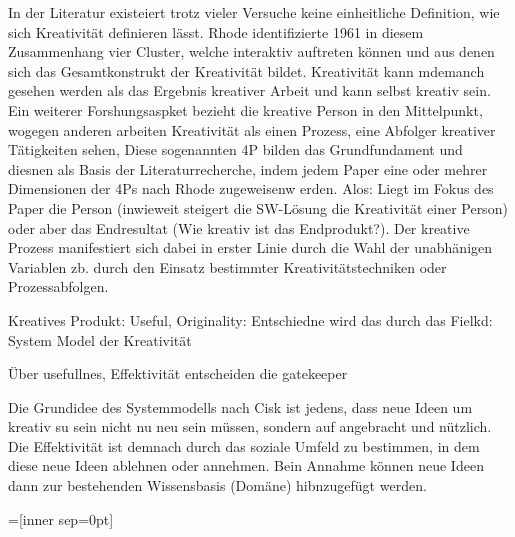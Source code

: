 In der Literatur existeiert trotz vieler Versuche keine einheitliche Definition, wie sich Kreativität definieren lässt. Rhode identifizierte 1961 in diesem Zusammenhang vier Cluster, welche interaktiv auftreten können und aus denen sich das Gesamtkonstrukt der Kreativität bildet. Kreativität kann mdemanch gesehen werden als das Ergebnis kreativer Arbeit und kann selbst kreativ sein. Ein weiterer Forshungsaspket bezieht die kreative Person in den Mittelpunkt, wogegen anderen arbeiten Kreativität als einen Prozess, eine Abfolger kreativer Tätigkeiten sehen,
Diese sogenannten 4P bilden das Grundfundament und diesnen als Basis der Literaturrecherche, indem jedem Paper eine oder mehrer Dimensionen der 4Ps nach Rhode zugeweisenw erden. Alos: Liegt im Fokus des Paper die Person (inwieweit steigert die SW-Lösung die Kreativität einer Person) oder aber das Endresultat (Wie kreativ ist das Endprodukt?). Der kreative Prozess manifestiert sich dabei in erster Linie durch die Wahl der unabhänigen Variablen zb. durch den Einsatz bestimmter Kreativitätstechniken oder Prozessabfolgen.

Kreatives Produkt: Useful, Originality: Entschiedne wird das durch das Fielkd: System Model der Kreativität

Über usefullnes, Effektivität entscheiden die gatekeeper

Die Grundidee des Systemmodells nach Cisk ist jedens, dass neue Ideen um kreativ su sein nicht nu neu sein müssen, sondern auf angebracht und nützlich. Die Effektivität ist demnach durch das soziale Umfeld zu bestimmen, in dem diese neue Ideen ablehnen oder annehmen. Bein Annahme können neue Ideen dann zur bestehenden Wissensbasis (Domäne) hibnzugefügt werden.

=[inner sep=0pt]

